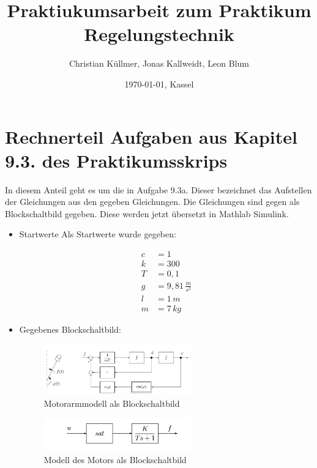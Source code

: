 \documentclass[11pt]{scrartcl}
\begin{document}
\title{Praktiukumsarbeit zum Praktikum Regelungstechnik}
\author{Christian Küllmer, Jonas Kallweidt, Leon Blum}
\date{\today{}, Kassel}
\maketitle
\newpage
\renewcommand{\contentsname}{Inhaltsverzeichnis}
\tableofcontents
\newpage

\section{Rechnerteil Aufgaben aus Kapitel 9.3. des Praktikumsskrips}
In diesem Anteil geht es um die in Aufgabe 9.3a. Dieser bezeichnet das Aufstellen der Gleichungen aus den gegeben Gleichungen. Die Gleichungen sind gegen als Blockschaltbild gegeben. Diese werden jetzt übersetzt in Mathlab Simulink.

\begin{itemize}
\item Startwerte
Als Startwerte wurde gegeben:

\begin{align}
   	c &= 1 \\k &= 300  \\ T& = 0,1\\ g &= 9,81\, \frac{m}{s^2} \\l &= 1\, m\\m &= 7\, kg
\end{align}

	
	


\item Gegebenes Blockschaltbild:
\begin{figure}[H]
	\centering
	\includegraphics[width=0.6\textwidth]{Aufgabe9aMotorarm.png}
	\caption{Motorarmmodell als Blockschaltbild}
	\label{img:grafik-dummy}
\end{figure}
\begin{figure}[H]
	\centering
	\includegraphics[width=0.6\textwidth]{Aufgabe9aStreckeMotor.png}
	\caption{Modell des Motors als Blockschaltbild}
	\label{img:grafik-dummy}
\end{figure}
\end{itemize}
\end{document}
